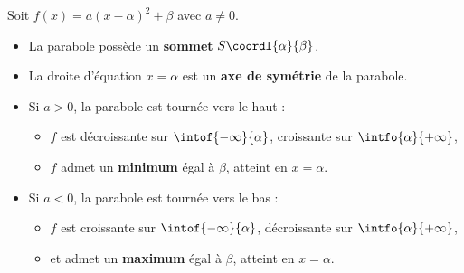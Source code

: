 \begin{prop}
	Soit $f(x) = a(x-\alpha)^2 + \beta$ avec $a \neq 0$.
	\begin{itemize}
		\item La parabole possède un \textbf{sommet} $S\coordl{\alpha}{\beta}$.
		\item La droite d'équation $x = \alpha$ est un \textbf{axe de symétrie} de la parabole.
		\item Si $a > 0$, la parabole est \og tournée vers le haut\fg{} :
		      \begin{itemize}
			      \item $f$ est décroissante sur $\intof{-\infty}{\alpha}$, croissante sur $\intfo{\alpha}{+\infty}$,
			      \item $f$ admet un \textbf{minimum} égal à $\beta$, atteint en $x = \alpha$.
		      \end{itemize}
		\item Si $a < 0$, la parabole est \og tournée vers le bas\fg{} :

		      \begin{itemize}
			      \item $f$ est croissante sur $\intof{-\infty}{\alpha}$, décroissante sur $\intfo{\alpha}{+\infty}$,
			      \item et admet un \textbf{maximum} égal à $\beta$, atteint en $x = \alpha$.
		      \end{itemize}
	\end{itemize}
\end{prop}

